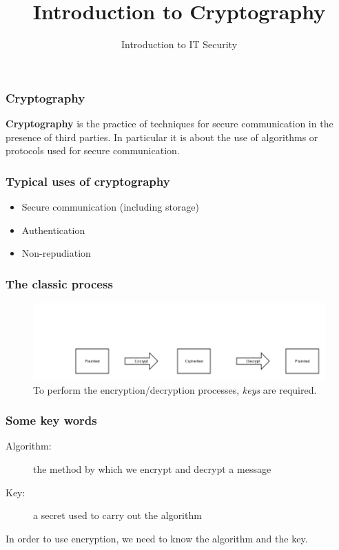 \documentclass[10pt]{beamer}
\title{Introduction to Cryptography}
\author[IN618]{Introduction to IT Security}
\institute[Otago Polytechnic]{
  Otago Polytechnic \\
  Dunedin, New Zealand \\
}
\date{}
\begin{document}
\begin{frame}[plain]
  \titlepage
\end{frame}

\begin{frame}
  \frametitle{Cryptography}

  \textbf{Cryptography} is the practice of techniques for secure communication 
  in the presence of third parties.  In particular it is about the use of
  algorithms or protocols used for secure communication.

\end{frame}


\begin{frame}
  \frametitle{Typical uses of cryptography}

 \begin{itemize}
  \item Secure communication (including storage)
  \item Authentication 
  \item Non-repudiation
  \end{itemize}
\end{frame}



\begin{frame}
  \frametitle{The classic process}

  \begin{figure}
    \includegraphics[scale=0.40]{encrypt-decrypt.png}
    \caption{To perform the encryption/decryption processes, \emph{keys} are required.}
  \end{figure}

\end{frame}


\begin{frame}
  \frametitle{Some key words}

 \begin{description}
  \item[Algorithm:] the method by which we encrypt and decrypt a message
  \item [Key:] a secret used to carry out the algorithm 
  \end{description}

In order to use encryption, we need to know the algorithm and the key.
\end{frame}
\end{document}
